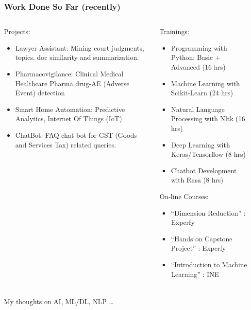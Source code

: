 \begin{frame}[fragile]\frametitle{Work Done So Far (recently)}
\begin{columns}

    \begin{column}[T]{0.4\linewidth}
	Projects:
      \begin{itemize}
		\item Lawyer Assistant: Mining court judgments, topics, doc similarity and summarization.
		\item Pharmacovigilance: Clinical Medical Healthcare Pharma drug-AE (Adverse Event) detection
		\item Smart Home Automation: Predictive Analytics, Internet Of Things (IoT)
		\item ChatBot: FAQ chat bot for GST (Goods and Services Tax) related queries.
	  \end{itemize}

    \end{column}
    \begin{column}[T]{0.6\linewidth}
	Trainings:
      \begin{itemize}
		\item Programming with Python: Basic + Advanced (16 hrs)
		\item Machine Learning with Scikit-Learn (24 hrs)
		\item Natural Language Processing with Nltk (16 hrs)
		\item Deep Learning with Keras/Tensorflow (8 hrs)
		\item Chatbot Development with Rasa (8 hrs)
	  \end{itemize}
	  On-line Courses:
      \begin{itemize}
		\item ``Dimension Reduction'' : Experfy
		\item ``Hands on Capstone Project'' : Experfy 
		\item ``Introduction to Machine Learning'' : INE
	  \end{itemize}	  
    \end{column}
  \end{columns}
\end{frame}


\begin{frame}[fragile]\frametitle{}
\begin{center}
{\Large My thoughts on AI, ML/DL, NLP \ldots}
\end{center}
\end{frame}

